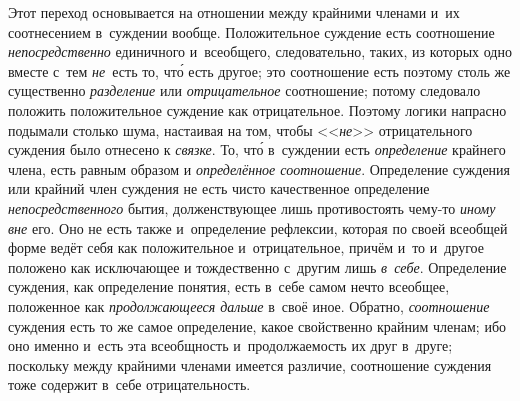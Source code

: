 Этот переход основывается на отношении между крайними членами и~их соотнесением
в~суждении вообще. Положительное суждение есть соотношение
{\em непосредственно} единичного и~всеобщего, следовательно, таких, из которых
одно вместе с~тем {\em не}~есть то, чт\'{о} есть другое; это соотношение есть
поэтому столь же существенно {\em разделение} или {\em отрицательное}
соотношение; потому следовало положить положительное суждение как отрицательное.
Поэтому логики напрасно подымали столько шума, настаивая на том, чтобы
<<{\em не}>> отрицательного суждения было отнесено к {\em связке}. То, чт\'{о}
в~суждении есть {\em определение} крайнего члена, есть равным образом
и {\em определённое соотношение}. Определение суждения или крайний член
суждения не есть чисто качественное определение {\em непосредственного} бытия,
долженствующее лишь противостоять чему-то {\em иному вне} его. Оно не есть
также и~определение рефлексии, которая по своей всеобщей форме ведёт себя как
положительное и~отрицательное, причём и~то и~другое положено как исключающее и
тождественно с~другим лишь {\em в~себе}. Определение суждения, как определение
понятия, есть в~себе самом нечто всеобщее, положенное как {\em продолжающееся
дальше} в~своё иное. Обратно, {\em соотношение} суждения есть то же самое
определение, какое свойственно крайним членам; ибо оно именно и~есть эта
всеобщность и~продолжаемость их друг в~друге; поскольку между крайними членами
имеется различие, соотношение суждения тоже содержит в~себе отрицательность.

